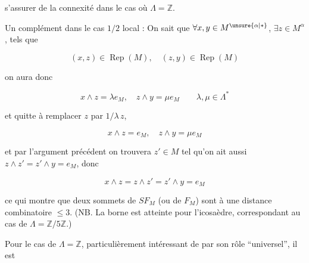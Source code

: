 
s'assurer de la connexité dans le cas où $\Lambda=\mathbb{Z}$.

Un complément dans le cas $1/2$ local :  On sait que  $\forall x,y\in M^{\unsure{\alpha|*}}$, $\exists z\in M^{\alpha}$, tels que

\[
(x,z)\in\operatorname{Rep}(M),\quad(z,y)\in\operatorname{Rep}(M)
\]

 on aura donc

\[
x\wedge z=\lambda e_M,\quad z\wedge y=\mu e_M\qquad\lambda,\mu\in\Lambda^*
\]

et quitte à remplacer $z$ par $1/\lambda\,z$, 

\[
x\wedge z=e_M,\quad z\wedge y=\mu e_M
\]

et par l'argument précédent on trouvera $z'\in M$ tel qu'on ait aussi $z\wedge z'=z'\wedge y=e_M$\unsure{)}, donc

\[
x\wedge z=z\wedge z'=z'\wedge y=e_M\tag*{(47)}
\]

ce qui montre que deux sommets de $SF_M$ (ou de $F_M$) sont à une distance combinatoire $\leq3$. (NB. La borne est atteinte pour l'icosaèdre, correspondant au cas de  $\Lambda=\mathbb{Z}/5\mathbb{Z}$.)

Pour le cas de $\Lambda=\mathbb{Z}$, particulièrement intéressant de par son rôle ``universel'', il est

